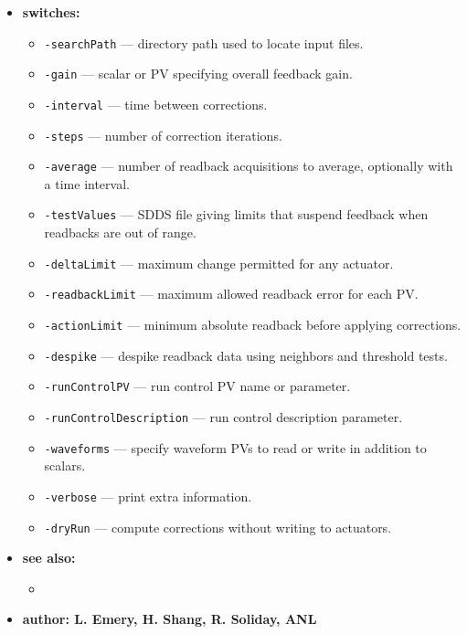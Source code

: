 \begin{itemize}
\item {\bf switches:}
  \begin{itemize}
  \item {\tt -searchPath} --- directory path used to locate input files.
  \item {\tt -gain} --- scalar or PV specifying overall feedback gain.
  \item {\tt -interval} --- time between corrections.
  \item {\tt -steps} --- number of correction iterations.
  \item {\tt -average} --- number of readback acquisitions to average, optionally with a time interval.
  \item {\tt -testValues} --- SDDS file giving limits that suspend feedback when readbacks are out of range.
  \item {\tt -deltaLimit} --- maximum change permitted for any actuator.
  \item {\tt -readbackLimit} --- maximum allowed readback error for each PV.
  \item {\tt -actionLimit} --- minimum absolute readback before applying corrections.
  \item {\tt -despike} --- despike readback data using neighbors and threshold tests.
  \item {\tt -runControlPV} --- run control PV name or parameter.
  \item {\tt -runControlDescription} --- run control description parameter.
  \item {\tt -waveforms} --- specify waveform PVs to read or write in addition to scalars.
  \item {\tt -verbose} --- print extra information.
  \item {\tt -dryRun} --- compute corrections without writing to actuators.
  \end{itemize}

\item {\bf see also:}
  \begin{itemize}
  \item {}
  \end{itemize}

\item {\bf author: L. Emery, H. Shang, R. Soliday, ANL}
\end{itemize}

